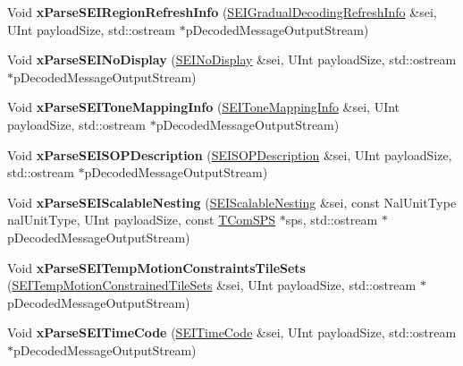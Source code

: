 \begin{DoxyCompactItemize}
Void {\bfseries x\+Parse\+S\+E\+I\+Region\+Refresh\+Info} (\hyperlink{class_s_e_i_gradual_decoding_refresh_info}{S\+E\+I\+Gradual\+Decoding\+Refresh\+Info} \&sei, U\+Int payload\+Size, std\+::ostream $\ast$p\+Decoded\+Message\+Output\+Stream)
\item 
\mbox{\label{class_s_e_i_reader_a5e76699040256c3f7ace777ba98b189f}} 
Void {\bfseries x\+Parse\+S\+E\+I\+No\+Display} (\hyperlink{class_s_e_i_no_display}{S\+E\+I\+No\+Display} \&sei, U\+Int payload\+Size, std\+::ostream $\ast$p\+Decoded\+Message\+Output\+Stream)
\item 
\mbox{\label{class_s_e_i_reader_a543298feab67c4b9073525646848f792}} 
Void {\bfseries x\+Parse\+S\+E\+I\+Tone\+Mapping\+Info} (\hyperlink{class_s_e_i_tone_mapping_info}{S\+E\+I\+Tone\+Mapping\+Info} \&sei, U\+Int payload\+Size, std\+::ostream $\ast$p\+Decoded\+Message\+Output\+Stream)
\item 
\mbox{\label{class_s_e_i_reader_a69a401caf6469c7c0212e0bab4d4c43b}} 
Void {\bfseries x\+Parse\+S\+E\+I\+S\+O\+P\+Description} (\hyperlink{class_s_e_i_s_o_p_description}{S\+E\+I\+S\+O\+P\+Description} \&sei, U\+Int payload\+Size, std\+::ostream $\ast$p\+Decoded\+Message\+Output\+Stream)
\item 
\mbox{\label{class_s_e_i_reader_ad734209b5dcd77f1d76f062a3f7c1809}} 
Void {\bfseries x\+Parse\+S\+E\+I\+Scalable\+Nesting} (\hyperlink{class_s_e_i_scalable_nesting}{S\+E\+I\+Scalable\+Nesting} \&sei, const Nal\+Unit\+Type nal\+Unit\+Type, U\+Int payload\+Size, const \hyperlink{class_t_com_s_p_s}{T\+Com\+S\+PS} $\ast$sps, std\+::ostream $\ast$p\+Decoded\+Message\+Output\+Stream)
\item 
\mbox{\label{class_s_e_i_reader_a2bf8a1b98409cca43d54e6cefc6c1922}} 
Void {\bfseries x\+Parse\+S\+E\+I\+Temp\+Motion\+Constraints\+Tile\+Sets} (\hyperlink{class_s_e_i_temp_motion_constrained_tile_sets}{S\+E\+I\+Temp\+Motion\+Constrained\+Tile\+Sets} \&sei, U\+Int payload\+Size, std\+::ostream $\ast$p\+Decoded\+Message\+Output\+Stream)
\item 
\mbox{\label{class_s_e_i_reader_a5fb6805dcec45d4b0ef9a5498a2f8f97}} 
Void {\bfseries x\+Parse\+S\+E\+I\+Time\+Code} (\hyperlink{class_s_e_i_time_code}{S\+E\+I\+Time\+Code} \&sei, U\+Int payload\+Size, std\+::ostream $\ast$p\+Decoded\+Message\+Output\+Stream)

\end{DoxyCompactItemize}
